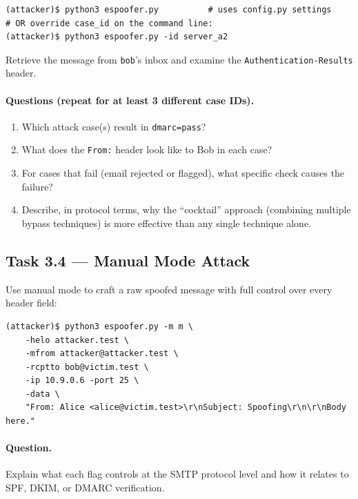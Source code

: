 \documentclass[11pt]{article}
\begin{document}
\begin{listing}[H]
\begin{verbatim}
(attacker)$ python3 espoofer.py          # uses config.py settings
# OR override case_id on the command line:
(attacker)$ python3 espoofer.py -id server_a2
\end{verbatim}
\end{listing}

Retrieve the message from \texttt{bob}'s inbox and examine the
\texttt{Authentication-Results} header.

\paragraph{Questions (repeat for at least 3 different case IDs).}
\begin{enumerate}[noitemsep]
  \item Which attack case(s) result in \texttt{dmarc=pass}?
  \item What does the \texttt{From:} header look like to Bob in each
    case?
  \item For cases that fail (email rejected or flagged), what specific
    check causes the failure?
  \item Describe, in protocol terms, why the ``cocktail'' approach
    (combining multiple bypass techniques) is more effective than any
    single technique alone.
\end{enumerate}

\subsection{Task 3.4 --- Manual Mode Attack}

Use manual mode to craft a raw spoofed message with full control over
every header field:

\begin{listing}[H]
\begin{verbatim}
(attacker)$ python3 espoofer.py -m m \
    -helo attacker.test \
    -mfrom attacker@attacker.test \
    -rcptto bob@victim.test \
    -ip 10.9.0.6 -port 25 \
    -data \
    "From: Alice <alice@victim.test>\r\nSubject: Spoofing\r\n\r\nBody here."
\end{verbatim}
\end{listing}

\paragraph{Question.}
Explain what each flag controls at the SMTP protocol level and how it
relates to SPF, DKIM, or DMARC verification.
\end{document}
